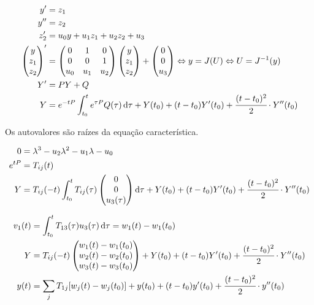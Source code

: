 \documentclass[12pt]{article}
\begin{document}
\begin{align}
 y' &= z_1 \\
 y'' &= z_2 \\
 z_2' &= u_0 y + u_1 z_1 + u_2 z_2 + u_3 \\
 \begin{pmatrix} y \\ z_1 \\ z_2 \end{pmatrix}' &= \begin{pmatrix} 0 & 1 & 0 \\ 0 & 0 & 1 \\ u_0 & u_1 & u_2 \end{pmatrix}\begin{pmatrix} y \\ z_1 \\ z_2 \end{pmatrix} + \begin{pmatrix} 0 \\ 0 \\ u_3 \end{pmatrix}\Leftrightarrow y = J(U) \Leftrightarrow U = J^{-1}(y) \\
 Y' &= P Y + Q \\
 Y &= e^{-tP} \int_{t_0}^t e^{\tau P} Q(\tau)\, \mathrm{d}\tau + Y(t_0) + (t-t_0) Y'(t_0) + \cfrac{(t - t_0)^2}{2}\cdot Y''(t_0)
\end{align}

Os autovalores s\~ao ra\'izes da equa\c{c}\~ao caracter\'istica.

\begin{align}
0 &= \lambda^3 - u_2\lambda^2 - u_1\lambda - u_0 \\
e^{tP} &= T_{ij}(t) \\
 Y &= T_{ij}(-t) \int_{t_0}^t T_{ij}(\tau) \begin{pmatrix} 0 \\ 0 \\ u_3(\tau) \end{pmatrix} \mathrm{d}\tau + Y(t_0) + (t-t_0) Y'(t_0) + \cfrac{(t - t_0)^2}{2}\cdot Y''(t_0)
\end{align}

\begin{align}
v_1(t) &= \int_{t_0}^t T_{13}(\tau) u_3(\tau) \,\mathrm{d}\tau = w_1(t) - w_1(t_0) \\
 Y &= T_{ij}(-t)  \begin{pmatrix} w_1(t) - w_1(t_0) \\ w_2(t) - w_2(t_0) \\ w_3(t) - w_3(t_0) \end{pmatrix} + Y(t_0) + (t-t_0) Y'(t_0)  + \cfrac{(t - t_0)^2}{2}\cdot Y''(t_0)  \\
 y(t) &= \sum_j T_{1j} [w_j(t) - w_j(t_0)]  + y(t_0) + (t-t_0) y'(t_0)  + \cfrac{(t - t_0)^2}{2}\cdot y''(t_0)
\end{align}
\end{document}

